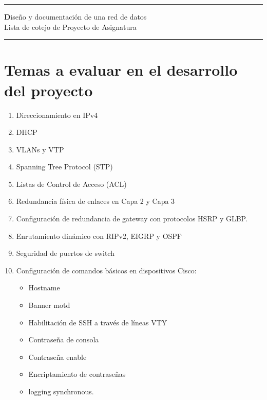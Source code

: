 \documentclass[12pt]{article}
\begin{document}

\begin{center}
\noindent\rule{\textwidth}{1pt}
{\huge\textbf Diseño y documentación de una red de datos}\\
\vspace{10px}
Lista de cotejo de Proyecto de Asignatura
\noindent\rule{\textwidth}{1pt}
\end{center}

\section{Temas a evaluar en el desarrollo del proyecto}
\begin{enumerate}
\item Direccionamiento en IPv4
\item DHCP
\item VLANs y VTP
\item Spanning Tree Protocol (STP)
\item Listas de Control de Acceso (ACL)
\item Redundancia física de enlaces en Capa 2 y Capa 3
\item Configuración de redundancia de gateway con protocolos HSRP y GLBP.
\item Enrutamiento dinámico con RIPv2, EIGRP y OSPF
\item Seguridad de puertos de switch
\item Configuración de comandos básicos en dispositivos Cisco:
	\begin{itemize}
    	\item Hostname
    	\item Banner motd
        \item Habilitación de SSH a través de líneas VTY
        \item Contraseña de consola
        \item Contraseña enable
        \item Encriptamiento de contraseñas
        \item logging synchronous.
    \end{itemize}
\end{enumerate}
\end{document}
